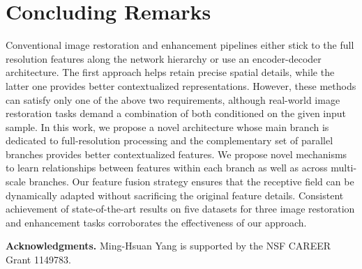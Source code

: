 \documentclass[runningheads]{llncs}
\begin{document}
\begin{table}[t]
\begin{center}
\caption{\small Ablation study on different layouts of MRB. \emph{Rows} denote the number of parallel resolution streams, and \emph{Cols} represent the number of columns containing DAUs. }
\label{table: ablation MRB}
\setlength{\tabcolsep}{7pt}
\end{center}\vspace{-2.5em}
\end{table}






\section{Concluding Remarks}

Conventional image restoration and enhancement pipelines either stick to the full resolution features along the network hierarchy or use an encoder-decoder architecture. The first approach helps retain precise spatial details, while the latter one provides better contextualized representations. However, these methods can satisfy only one of the above two requirements, although real-world image restoration tasks demand a combination of both conditioned on the given input sample. In this work, we propose a novel architecture whose main branch is dedicated to full-resolution processing and the complementary set of parallel branches provides better contextualized features. We propose novel mechanisms to learn relationships between features within each branch as well as across multi-scale branches. Our feature fusion strategy ensures that the receptive field can be dynamically adapted without sacrificing the original feature details. Consistent achievement of state-of-the-art results on five datasets for three image restoration and enhancement tasks corroborates the effectiveness of our approach. 

\vspace{0.5em}\noindent\textbf{Acknowledgments.} Ming-Hsuan Yang is supported by the NSF CAREER Grant 1149783.


\end{document}
